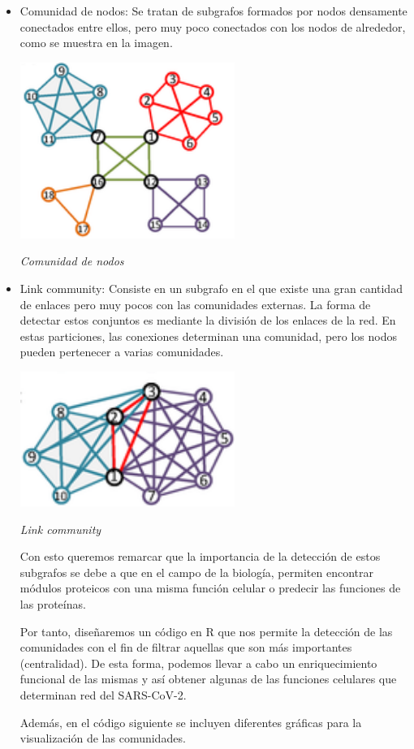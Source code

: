 \begin{itemize}
\item Comunidad de nodos: Se tratan de subgrafos formados por nodos densamente conectados entre ellos, pero muy poco conectados con los nodos de alrededor, como se muestra en la imagen. 


\begin{center}

\includegraphics[width=70mm,scale=1.2]{report/figures/nodes.png}

\caption{\textit{Comunidad de nodos}}

\end{center}


\item Link community: Consiste en un subgrafo en el que existe una gran cantidad de enlaces pero muy pocos con las comunidades externas. La forma de detectar estos conjuntos es mediante la división de los enlaces de la red. En estas particiones, las conexiones determinan una comunidad, pero los nodos pueden pertenecer a varias comunidades. 


\begin{center}
\includegraphics[width=70mm,scale=1.2]{report/figures/links.png}


\caption{\textit{Link community}}

\end{center}

Con esto queremos remarcar que la importancia de la detección de estos subgrafos se debe a que en el campo de la biología, permiten encontrar módulos proteicos con una misma función celular o predecir las funciones de las proteínas.

Por tanto, diseñaremos un código en R que nos permite la detección de las comunidades con el fin de filtrar aquellas que son más importantes (centralidad). De esta forma, podemos llevar a cabo un enriquecimiento funcional de las mismas y así obtener algunas de las funciones celulares que determinan red del SARS-CoV-2.

Además, en el código siguiente se incluyen diferentes gráficas para la visualización de las comunidades.
\end{itemize}

